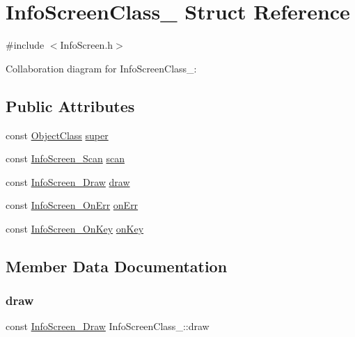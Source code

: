 \hypertarget{structInfoScreenClass__}{}\section{Info\+Screen\+Class\+\_\+ Struct Reference}
\label{structInfoScreenClass__}


{\ttfamily \#include $<$Info\+Screen.\+h$>$}



Collaboration diagram for Info\+Screen\+Class\+\_\+\+:
\subsection*{Public Attributes}
\begin{DoxyCompactItemize}
\item 
const \hyperlink{Object_8h_a6feb151c3b8f61fae503dfbcdc3d6a54}{Object\+Class} \hyperlink{structInfoScreenClass___a9921201ff374d186aa1e2b22ec323601}{super}
\item 
const \hyperlink{InfoScreen_8h_a3e85dee971a09c2c150bd817fe83a089}{Info\+Screen\+\_\+\+Scan} \hyperlink{structInfoScreenClass___a726fb2becca1f0cb9893c5a106957977}{scan}
\item 
const \hyperlink{InfoScreen_8h_accf93b2ccd83275c2609187498d28474}{Info\+Screen\+\_\+\+Draw} \hyperlink{structInfoScreenClass___ad0f689442b8dc89ec4670649a7cb93af}{draw}
\item 
const \hyperlink{InfoScreen_8h_a11622325cc1cdfa5afe9beaf7c7d67bb}{Info\+Screen\+\_\+\+On\+Err} \hyperlink{structInfoScreenClass___a4f5e553582c2595e2b72b55cd6ed5d0a}{on\+Err}
\item 
const \hyperlink{InfoScreen_8h_a4e1c3f0fd1b989598119d0b28d49e804}{Info\+Screen\+\_\+\+On\+Key} \hyperlink{structInfoScreenClass___a02be6a307bda4b8ee42998aecdfe0031}{on\+Key}
\end{DoxyCompactItemize}


\subsection{Member Data Documentation}
\mbox{\label{structInfoScreenClass___ad0f689442b8dc89ec4670649a7cb93af}} 
\subsubsection{\texorpdfstring{draw}{draw}}
{\footnotesize\ttfamily const \hyperlink{InfoScreen_8h_accf93b2ccd83275c2609187498d28474}{Info\+Screen\+\_\+\+Draw} Info\+Screen\+Class\+\_\+\+::draw}

